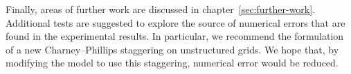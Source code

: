 
Finally, areas of further work are discussed in chapter~\ref{sec:further-work}.  Additional tests are suggested to explore the source of numerical errors that are found in the experimental results.  In particular, we recommend the formulation of a new Charney--Phillips staggering on unstructured grids.  We hope that, by modifying the model to use this staggering, numerical error would be reduced.
